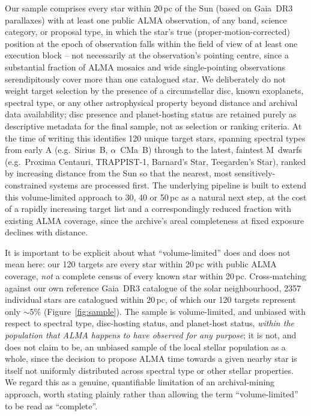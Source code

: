 \documentclass{openjournal}
\begin{document}
Our sample comprises every star within 20\,pc of the Sun (based on Gaia~DR3
parallaxes) with at least one public ALMA observation, of any band, science
category, or proposal type, in which the star's true (proper-motion-corrected)
position at the epoch of observation falls within the field of view of at least
one execution block -- not necessarily at the observation's pointing centre,
since a substantial fraction of ALMA mosaics and wide single-pointing
observations serendipitously cover more than one catalogued star. We deliberately
do not weight target selection by the presence of a circumstellar disc, known
exoplanets, spectral type, or any other astrophysical property beyond distance
and archival data availability; disc presence and planet-hosting status are
retained purely as descriptive metadata for the final sample, not as
selection or ranking criteria. At the time of writing this identifies 120 unique
target stars, spanning spectral types from early A (e.g.\ Sirius~B, $\alpha$~CMa~B)
through to the latest, faintest M~dwarfs (e.g.\ Proxima Centauri, TRAPPIST-1,
Barnard's Star, Teegarden's Star), ranked by increasing distance from the Sun so
that the nearest, most sensitively-constrained systems are processed first. The
underlying pipeline is built to extend this volume-limited approach to 30, 40 or
50\,pc as a natural next step, at the cost of a rapidly increasing target list
and a correspondingly reduced fraction with existing ALMA coverage, since the
archive's areal completeness at fixed exposure declines with distance.

It is important to be explicit about what ``volume-limited'' does and does
not mean here: our 120 targets are every star within 20\,pc with public
ALMA coverage, \emph{not} a complete census of every known star within
20\,pc. Cross-matching against our own reference Gaia~DR3 catalogue of
the solar neighbourhood, 2357 individual stars are catalogued within
20\,pc, of which our 120 targets represent only $\sim$5\%
(Figure~\ref{fig:sample}). The sample is volume-limited, and unbiased
with respect to spectral type, disc-hosting status, and planet-host
status, \emph{within the population that ALMA happens to have observed
for any purpose}; it is not, and does not claim to be, an unbiased sample
of the local stellar population as a whole, since the decision to propose
ALMA time towards a given nearby star is itself not uniformly
distributed across spectral type or other stellar properties. We regard
this as a genuine, quantifiable limitation of an archival-mining
approach, worth stating plainly rather than allowing the term
``volume-limited'' to be read as ``complete''.
\end{document}
